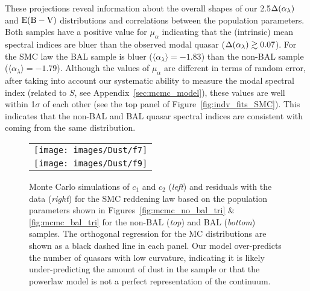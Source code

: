 

These projections reveal information about the overall shapes of our 2.5$\Delta(\alpha_{\lambda})$ and ${\rm E(B-V)}$ distributions and correlations between the population parameters.  Both samples have a positive value for $\mu_{\alpha}$ indicating that the (intrinsic) mean spectral indices are bluer than the observed modal quasar ($\Delta(\alpha_{\lambda}) \gtrsim 0.07$).
For the SMC law the BAL sample is bluer ($\langle \alpha_\lambda \rangle = -1.83$) than the non-BAL sample ($\langle \alpha_\lambda \rangle = -1.79$).
Although the values of $\mu_\alpha$ are different in terms of random error, after taking into account our systematic ability to measure the modal spectral index (related to $S$, see Appendix~\ref{sec:mcmc_model}), these values are well within 1$\sigma$ of each other (see the top panel of Figure~\ref{fig:indv_fits_SMC}). This indicates that the non-BAL and BAL quasar spectral indices are consistent with coming from the same distribution.

\begin{figure*}[t]
\begin{center}
\begin{tabular}{c}
	\texttt{[image: images/Dust/f7]} \\
	\texttt{[image: images/Dust/f9]}
\end{tabular}
\caption[$c_1$ vs. $c_2$ for MC sample of non-BAL quasars]{\label{fig:mcmc_no_bal_mc} 
Monte Carlo simulations of $c_1$ and $c_2$ ({\em left}) and residuals with the data ({\em right}) for the SMC reddening law based on the population parameters shown in Figures~\ref{fig:mcmc_no_bal_tri} \& \ref{fig:mcmc_bal_tri} for the non-BAL ({\em top}) and BAL ({\em bottom}) samples. The orthogonal regression for the MC distributions are shown as a black dashed line in each panel.
Our model over-predicts the number of quasars with low curvature, indicating it is likely under-predicting the amount of dust in the sample or that the powerlaw model is not a perfect representation of the continuum.}
\end{center}
\end{figure*}

